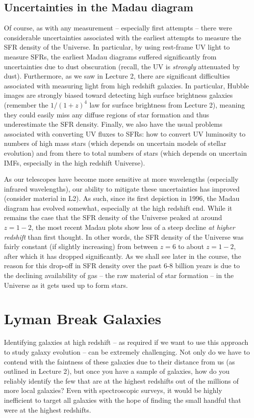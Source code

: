 \documentclass[11pt]{article}
\begin{document}
\subsection{Uncertainties in the Madau diagram}
Of course, as with any measurement -- especially first attempts --
there were considerable uncertainties associated with the earliest
attempts to measure the SFR density of the Universe. In particular, by
using rest-frame UV light to measure SFRs, the earliest Madau diagrams
suffered significantly from uncertainties due to dust obscuration
(recall, the UV is {\it strongly} attenuated by dust). Furthermore, as
we saw in Lecture 2, there are significant difficulties associated
with measuring light from high redshift galaxies. In particular,
Hubble images are strongly biased toward detecting high surface
brightness galaxies (remember the $1/(1+z)^4$ law for surface
brightness from Lecture 2), meaning they could easily miss any diffuse
regions of star formation and thus underestimate the SFR
density. Finally, we also have the usual problems associated with
converting UV fluxes to SFRs: how to convert UV luminosity to
numbers of high mass stars (which depends on uncertain models of
stellar evolution) and from there to total numbers of stars (which
depends on uncertain IMFs, especially in the high redshift Universe). 

As our telescopes have become more sensitive at more wavelengths
(especially infrared wavelengths), our ability to mitigate these
uncertainties has improved (consider material in L2). As such, since
its first depiction in 1996, the Madau diagram has evolved somewhat,
especially at the high redshift end. While it remains the case that
the SFR density of the Universe peaked at around $z=1-2$, the most
recent Madau plots show less of a steep decline {\it at higher
  redshift} than first thought. In other words, the SFR density of the
Universe was fairly constant (if slightly increasing) from between
$z=6$ to about $z=1-2$, after which it has dropped significantly. As
we shall see later in the course, the reason for this drop-off in SFR
density over the past 6-8 billion years is due to the declining
availability of gas -- the raw material of star formation -- in the
Universe as it gets used up to form stars.

\section{Lyman Break Galaxies}
Identifying galaxies at high redshift -- as required if we want to use
this approach to study galaxy evolution -- can be extremely
challenging. Not only do we have to contend with the faintness of
these galaxies due to their distance from us (as outlined in Lecture
2), but once you have a sample of galaxies, how do you reliably
identify the few that are at the highest redshifts out of the millions
of more local galaxies? Even with spectroscopic surveys, it would be
highly inefficient to target all galaxies with the hope of finding the
small handful that were at the highest redshifts.
\end{document}
